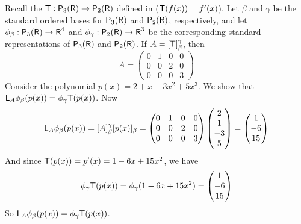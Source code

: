 \begin{example} \label{example 2.4.7}
Recall the \LTRAN{} \(\textsf{T} : \textsf{P}_3(\textsf{R}) \to \textsf{P}_2(\textsf{R})\) defined in  (\(\textsf{T}(f(x)) = f'(x)\)).
Let \(\beta\) and \(\gamma\) be the standard ordered bases for \(\textsf{P}_3(\textsf{R})\) and \(\textsf{P}_2(\textsf{R})\), respectively,
and let \(\phi_{\beta} : \textsf{P}_3(\textsf{R}) \to \textsf{R}^4\) and \(\phi_{\gamma} : \textsf{P}_2(\textsf{R}) \to \textsf{R}^3\) be the corresponding standard representations of \(\textsf{P}_3(\textsf{R})\) and \(\textsf{P}_2(\textsf{R})\).
If \(A = [\textsf{T}]_{\beta}^{\gamma}\), then
\[
    A = \begin{pmatrix} 0 & 1 & 0 & 0 \\ 0 & 0 & 2 & 0 \\ 0 & 0 & 0 & 3 \end{pmatrix}
\]
Consider the polynomial \(p(x) = 2 + x - 3x^2 + 5x^3\).
We show that \(\textsf{L}_A \phi_{\beta} (p(x)) = \phi_{\gamma} \textsf{T} (p(x))\).
Now
\[
    \textsf{L}_A \phi_{\beta} (p(x)) = [A]_{\beta}^{\gamma} [p(x)]_{\beta} 
    = \begin{pmatrix} 0 & 1 & 0 & 0 \\ 0 & 0 & 2 & 0 \\ 0 & 0 & 0 & 3 \end{pmatrix} \begin{pmatrix} 2 \\ 1 \\ -3 \\ 5 \end{pmatrix} = \begin{pmatrix} 1 \\ -6 \\ 15 \end{pmatrix}
\]
And since \(\textsf{T}(p(x)) = p'(x) = 1 - 6x + 15x^2\), we have
\[
    \phi_{\gamma} \textsf{T} (p(x)) = \phi_{\gamma} (1 - 6x + 15 x^2) = \begin{pmatrix} 1 \\ -6 \\ 15 \end{pmatrix}
\]
So \(\textsf{L}_A \phi_{\beta} (p(x)) = \phi_{\gamma} \textsf{T} (p(x))\).
\end{example}
